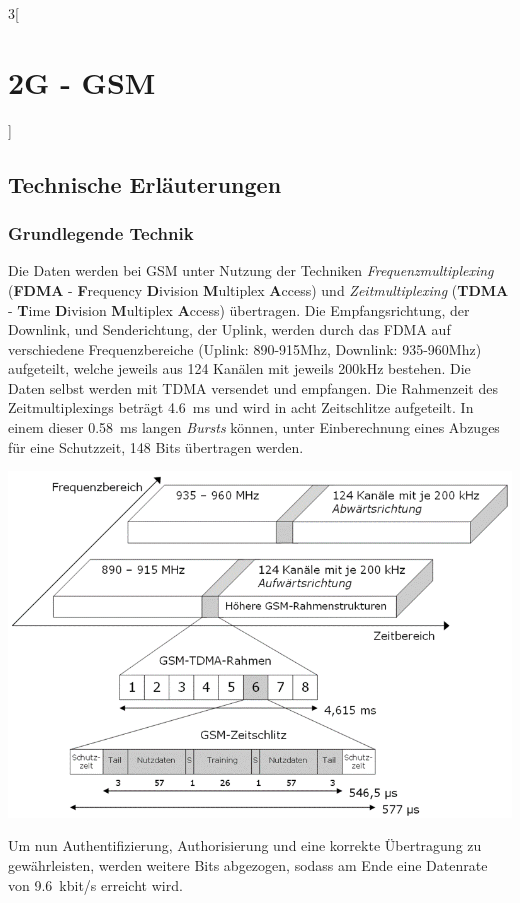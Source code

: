 \begin{multicols}{3}[\section{2G - GSM}]
\subsection*{Technische Erläuterungen}
\subsubsection*{Grundlegende Technik}
Die Daten werden bei GSM unter Nutzung der Techniken \textit{Frequenzmultiplexing} (\textbf{FDMA} - \textbf{F}requency \textbf{D}ivision \textbf{M}ultiplex \textbf{A}ccess) und \textit{Zeitmultiplexing} (\textbf{TDMA} - \textbf{T}ime \textbf{D}ivision \textbf{M}ultiplex \textbf{A}ccess) übertragen. Die Empfangsrichtung, der Downlink, und Senderichtung, der Uplink, werden durch das FDMA auf verschiedene Frequenzbereiche (Uplink: 890-915Mhz, Downlink: 935-960Mhz) aufgeteilt, welche jeweils aus 124 Kanälen mit jeweils 200kHz bestehen. Die Daten selbst werden mit TDMA versendet und empfangen. Die Rahmenzeit des Zeitmultiplexings beträgt \SI{4,6}{ms} und wird in acht Zeitschlitze aufgeteilt. In einem dieser \SI{0,58}{ms} langen \textit{Bursts} können, unter Einberechnung eines Abzuges für eine Schutzzeit, 148 Bits übertragen werden.
\begin{Figure}
\includegraphics[width=\linewidth]{Kapitel/2G/Grafiken/GSM-Frequenzaufteilung.png}
\label{fig:G2.frequenzaufteilung}
\end{Figure}
\noindent
Um nun Authentifizierung, Authorisierung und eine korrekte Übertragung zu gewährleisten, werden weitere Bits abgezogen, sodass am Ende eine Datenrate von \SI{9,6}{kbit/s} erreicht wird. \cite{G2.1}\cite{G2.3}

\end{multicols}
